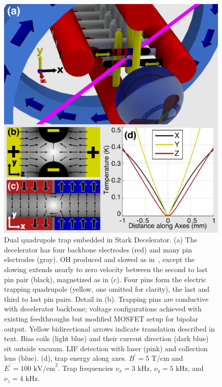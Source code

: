 \documentclass[%
 reprint,
groupedaddress,
 amsmath,amssymb,
 aps,
prl,
]{revtex4-1}
\begin{document}
\begin{figure}[tb]
\includegraphics[width=\linewidth]{Geometry/CAD_recolor_laser_panels.PNG}%
\caption{
Dual quadrupole trap embedded in Stark Decelerator. (a) The decelerator has four backbone electrodes (red) and many pin electrodes (gray). OH produced and slowed as in~\cite{Sawyer2008}, except the slowing extends nearly to zero velocity between the second to last pin pair (black), magnetized as in (c). Four pins form the electric trapping quadrupole (yellow, one omitted for clarity), the last and third to last pin pairs. Detail in (b). Trapping pins are conductive with decelerator backbone; voltage configurations achieved with existing feedthroughs but modified MOSFET setup for bipolar output. Yellow bidirectional arrows indicate translation described in text. Bias coils (light blue) and their current direction (dark blue) sit outside vacuum. LIF detection with laser (pink) and collection lens (blue). (d), trap energy along axes. $B^\prime=5\text{ T/cm}$ and $E^\prime=100 \text{ kV/cm}^2$. Trap frequencies $\nu_x=3\text{ kHz}$, $\nu_y=5\text{ kHz}$, and $\nu_z=4\text{ kHz}$.\label{fig:CAD}}
\end{figure}
\end{document}
